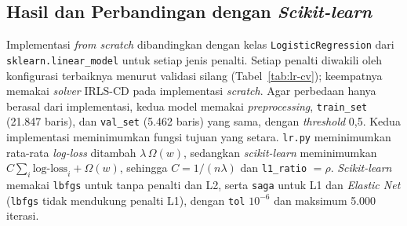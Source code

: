 \subsection{Hasil dan Perbandingan dengan \textit{Scikit-learn}}
\label{subsec:lr-hasil}

Implementasi \textit{from scratch} dibandingkan dengan kelas \texttt{LogisticRegression} dari \texttt{sklearn.linear\_model} \cite{pedregosa2011sklearn,sklearn-lr-guide} untuk setiap jenis penalti. Setiap penalti diwakili oleh konfigurasi terbaiknya menurut validasi silang (Tabel~\ref{tab:lr-cv}); keempatnya memakai \textit{solver} IRLS-CD pada implementasi \textit{scratch}. Agar perbedaan hanya berasal dari implementasi, kedua model memakai \textit{preprocessing}, \texttt{train\_set} (21.847 baris), dan \texttt{val\_set} (5.462 baris) yang sama, dengan \textit{threshold} 0,5. Kedua implementasi meminimumkan fungsi tujuan yang setara. \texttt{lr.py} meminimumkan rata-rata \textit{log-loss} ditambah $\lambda\,\Omega(w)$, sedangkan \textit{scikit-learn} meminimumkan $C\sum_i \text{log-loss}_i + \Omega(w)$, sehingga $C = 1/(n\lambda)$ dan \texttt{l1\_ratio} $=\rho$. \textit{Scikit-learn} memakai \texttt{lbfgs} untuk tanpa penalti dan L2, serta \texttt{saga} untuk L1 dan \textit{Elastic Net} (\texttt{lbfgs} tidak mendukung penalti L1), dengan \texttt{tol} $10^{-6}$ dan maksimum 5.000 iterasi.

